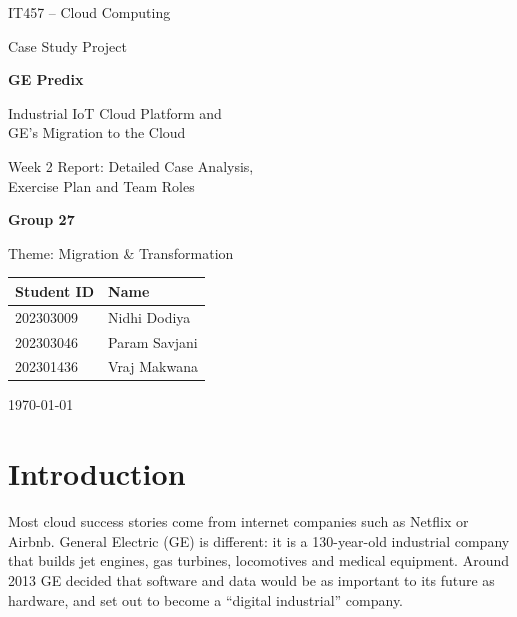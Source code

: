 \documentclass[12pt,a4paper]{article}
\begin{document}
\begin{titlepage}
\centering
\vspace*{2cm}
{\large IT457 -- Cloud Computing\par}
\vspace{0.4cm}
{\large Case Study Project\par}
\vspace{2cm}
{\Huge\bfseries\color{head} GE Predix\par}
\vspace{0.4cm}
{\LARGE Industrial IoT Cloud Platform and\\[4pt] GE's Migration to the Cloud\par}
\vspace{1.5cm}
{\Large Week 2 Report: Detailed Case Analysis,\\[4pt] Exercise Plan and Team Roles\par}
\vspace{2.5cm}
{\large\bfseries Group 27\par}
\vspace{0.3cm}
{\large Theme: Migration \& Transformation\par}
\vspace{1cm}
\begin{tabular}{ll}
\toprule
\textbf{Student ID} & \textbf{Name} \\
\midrule
202303009 & Nidhi Dodiya \\
202303046 & Param Savjani \\
202301436 & Vraj Makwana \\
\bottomrule
\end{tabular}
\vfill
{\large \today\par}
\end{titlepage}

\setcounter{tocdepth}{1}
\tableofcontents
\newpage

\section{Introduction}
Most cloud success stories come from internet companies such as Netflix or Airbnb.
General Electric (GE) is different: it is a 130-year-old industrial company that builds jet engines,
gas turbines, locomotives and medical equipment. Around 2013 GE decided that software and data would be as
important to its future as hardware, and set out to become a ``digital industrial'' company.
\end{document}
